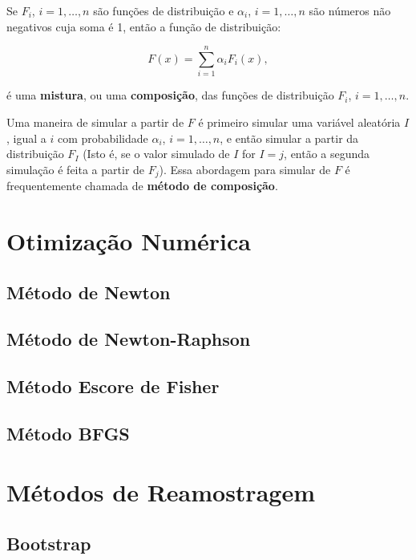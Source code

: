 \documentclass[
  letterpaper,
  DIV=11,
  numbers=noendperiod]{scrreprt}
\begin{document}
Se \(F_i\), \(i=1,\dots,n\) são funções de distribuição e \(\alpha_i\),
\(i=1,\dots,n\) são números não negativos cuja soma é 1, então a função
de distribuição:

\[
F(x) = \sum_{i=1}^n \alpha_i F_i(x),
\]

é uma \textbf{mistura}, ou uma \textbf{composição}, das funções de
distribuição \(F_i\), \(i = 1, \dots, n\).

Uma maneira de simular a partir de \(F\) é primeiro simular uma variável
aleatória \(I\), igual a \(i\) com probabilidade \(\alpha_i\),
\(i=1,\dots,n\), e então simular a partir da distribuição \(F_I\) (Isto
é, se o valor simulado de \(I\) for \(I = j\), então a segunda simulação
é feita a partir de \(F_j\)). Essa abordagem para simular de \(F\) é
frequentemente chamada de \textbf{método de composição}.


\chapter{Otimização Numérica}\label{otimizauxe7uxe3o-numuxe9rica}

\section{Método de Newton}\label{muxe9todo-de-newton}

\section{Método de Newton-Raphson}\label{muxe9todo-de-newton-raphson}

\section{Método Escore de Fisher}\label{muxe9todo-escore-de-fisher}

\section{Método BFGS}\label{muxe9todo-bfgs}


\chapter{Métodos de Reamostragem}\label{muxe9todos-de-reamostragem}

\section{Bootstrap}\label{bootstrap}
\end{document}
